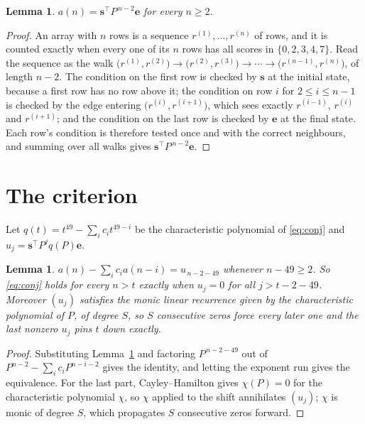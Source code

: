 \documentclass[11pt,a4paper]{article}
\theoremstyle{plain}
\newtheorem{lemma}[theorem]{Lemma}
\theoremstyle{definition}
\begin{document}
\begin{lemma}\label{lem:walk}
$a(n)=\mathbf{s}^{\!\top}P^{\,n-2}\mathbf{e}$ for every $n\ge2$.
\end{lemma}

\begin{proof}
An array with $n$ rows is a sequence $r^{(1)},\dots,r^{(n)}$ of rows, and it is counted
exactly when every one of its $n$ rows has all scores in $\{0,2,3,4,7\}$. Read the sequence as the
walk $\bigl(r^{(1)},r^{(2)}\bigr)\to\bigl(r^{(2)},r^{(3)}\bigr)\to\cdots\to
\bigl(r^{(n-1)},r^{(n)}\bigr)$, of length $n-2$. The condition on the first row is
checked by $\mathbf{s}$ at the initial state, because a first row has no row above it; the
condition on row $i$ for $2\le i\le n-1$ is checked by the edge entering
$\bigl(r^{(i)},r^{(i+1)}\bigr)$, which sees exactly $r^{(i-1)}$, $r^{(i)}$ and
$r^{(i+1)}$; and the condition on the last row is checked by $\mathbf{e}$ at the final
state. Each row's condition is therefore tested once and with the correct neighbours, and
summing over all walks gives $\mathbf{s}^{\!\top}P^{\,n-2}\mathbf{e}$.
\end{proof}

\section{The criterion}

Let $q(t)=t^{49}-\sum_i c_i t^{49-i}$ be the characteristic polynomial of
\eqref{eq:conj} and $u_j=\mathbf{s}^{\!\top}P^{j}q(P)\mathbf{e}$.

\begin{lemma}\label{lem:crit}
$a(n)-\sum_i c_i a(n-i)=u_{\,n-2-49}$ whenever $n-49\ge2$. So \eqref{eq:conj}
holds for every $n>t$ exactly when $u_j=0$ for all $j>t-2-49$. Moreover $(u_j)$
satisfies the monic linear recurrence given by the characteristic polynomial of $P$, of
degree $S$, so $S$ consecutive zeros force every later one and the last nonzero $u_j$ pins
$t$ down exactly.
\end{lemma}

\begin{proof}
Substituting Lemma~\ref{lem:walk} and factoring $P^{\,n-2-49}$ out of
$P^{n-2}-\sum_i c_i P^{n-i-2}$ gives the identity, and letting the exponent run gives the
equivalence. For the last part, Cayley--Hamilton gives $\chi(P)=0$ for the characteristic
polynomial $\chi$, so $\chi$ applied to the shift annihilates $(u_j)$; $\chi$ is monic of
degree $S$, which propagates $S$ consecutive zeros forward.
\end{proof}
\end{document}
